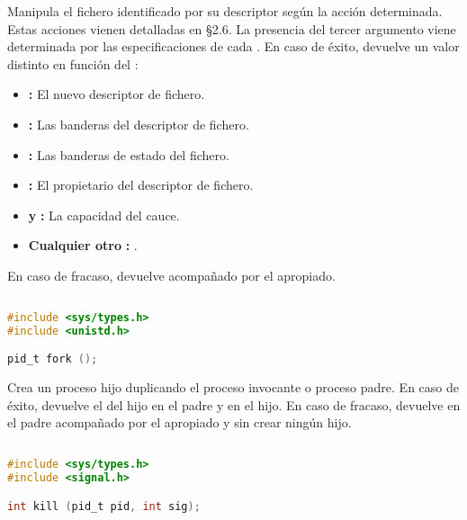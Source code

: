 Manipula el fichero identificado por su descriptor  según la acción  determinada.
Estas acciones vienen detalladas en \S2.6.
La presencia del tercer argumento  viene determinada por las especificaciones de cada .
En caso de éxito, devuelve un valor distinto en función del :

\begin{itemize}
	\item{}\textbf{:} El nuevo descriptor de fichero.
	\item{}\textbf{:} Las banderas del descriptor de fichero.
	\item{}\textbf{:} Las banderas de estado del fichero.
	\item{}\textbf{:} El propietario del descriptor de fichero.
	\item{} \textbf{y} \textbf{:} La capacidad del cauce.
	\item\textbf{Cualquier otro} \textbf{:} .
\end{itemize}

En caso de fracaso, devuelve  acompañado por el  apropiado.

\pagebreak

\subsection{}\label{fork}

\begin{lstlisting}[language=C]
#include <sys/types.h>
#include <unistd.h>

pid_t fork ();
\end{lstlisting}

Crea un proceso hijo duplicando el proceso invocante o proceso padre.
En caso de éxito, devuelve el  del hijo en el padre y  en el hijo.
En caso de fracaso, devuelve  en el padre acompañado por el  apropiado y sin crear ningún hijo.

\subsection{}\label{kill}

\begin{lstlisting}[language=C]
#include <sys/types.h>
#include <signal.h>

int kill (pid_t pid, int sig);
\end{lstlisting}

